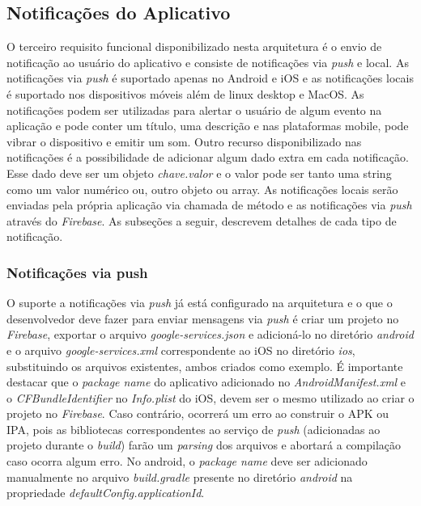 \subsection{Notificações do Aplicativo}
O terceiro requisito funcional disponibilizado nesta arquitetura é o envio de notificação ao usuário do aplicativo e consiste de notificações via \textit{push} e local. As notificações via \textit{push} é suportado apenas no Android e iOS e as notificações locais é suportado nos dispositivos móveis além de linux desktop e MacOS. As notificações podem ser utilizadas para alertar o usuário de algum evento na aplicação e pode conter um título, uma descrição e nas plataformas mobile, pode vibrar o dispositivo e emitir um som. Outro recurso disponibilizado nas notificações é a possibilidade de adicionar algum dado extra em cada notificação. Esse dado deve ser um objeto \textit{chave.valor} e o valor pode ser tanto uma string como um valor numérico ou, outro objeto ou array. As notificações locais serão enviadas pela própria aplicação via chamada de método e as notificações via \textit{push} através do \textit{Firebase}. As subseções a seguir, descrevem detalhes de cada tipo de notificação.

\subsubsection{Notificações via push}
O suporte a notificações via \textit{push} já está configurado na arquitetura e o que o desenvolvedor deve fazer para enviar mensagens via \textit{push} é criar um projeto no \textit{Firebase}, exportar o arquivo \textit{google-services.json} e adicioná-lo no diretório \textit{android} e o arquivo \textit{google-services.xml} correspondente ao iOS no diretório \textit{ios}, substituindo os arquivos existentes, ambos criados como exemplo. É importante destacar que o \textit{package name} do aplicativo adicionado no \textit{AndroidManifest.xml} e o \textit{CFBundleIdentifier} no \textit{Info.plist} do iOS, devem ser o mesmo utilizado ao criar o projeto no \textit{Firebase}. Caso contrário, ocorrerá um erro ao construir o APK ou IPA, pois as bibliotecas correspondentes ao serviço de \textit{push} (adicionadas ao projeto durante o \textit{build}) farão um \textit{parsing} dos arquivos e abortará a compilação caso ocorra algum erro. No android, o \textit{package name} deve ser adicionado manualmente no arquivo \textit{build.gradle} presente no diretório \textit{android} na propriedade \textit{defaultConfig.applicationId}.\par

